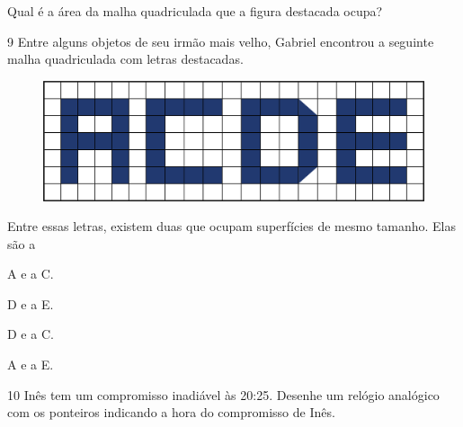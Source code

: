 Qual é a área da malha quadriculada que a figura destacada ocupa?

\begin{mdframed}[linewidth=2pt,linecolor=salmao,roundcorner=2pt]
\vspace{2cm}
\end{mdframed}

\num{9} Entre alguns objetos de seu irmão mais velho, Gabriel encontrou a seguinte
malha quadriculada com letras destacadas.

\begin{figure}[htpb!]
\centering
\includegraphics[width=.95\textwidth]{media/image34.png}
\end{figure}

\pagebreak

Entre essas letras, existem duas que ocupam superfícies de mesmo tamanho. Elas são a

\begin{escolha}
\item
  A e a C.
\item
  D e a E.
\item
  D e a C.
\item
  A e a E.
\end{escolha}


\num{10} Inês tem um compromisso inadiável às 20:25. Desenhe um relógio analógico
com os ponteiros indicando a hora do compromisso de Inês.

\begin{mdframed}[linewidth=2pt,linecolor=salmao,roundcorner=2pt]
\vspace{11cm}
\end{mdframed}



